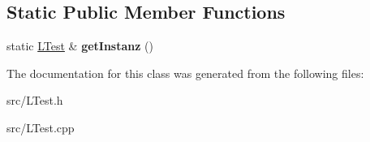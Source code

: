 \subsection*{Static Public Member Functions}
\begin{DoxyCompactItemize}
\item 
\hypertarget{class_l_test_ab206c77c647c40566605eabae8f910e3}{static \hyperlink{class_l_test}{L\-Test} \& {\bfseries get\-Instanz} ()}\label{class_l_test_ab206c77c647c40566605eabae8f910e3}

\end{DoxyCompactItemize}


The documentation for this class was generated from the following files\-:\begin{DoxyCompactItemize}
\item 
src/L\-Test.\-h\item 
src/L\-Test.\-cpp\end{DoxyCompactItemize}
